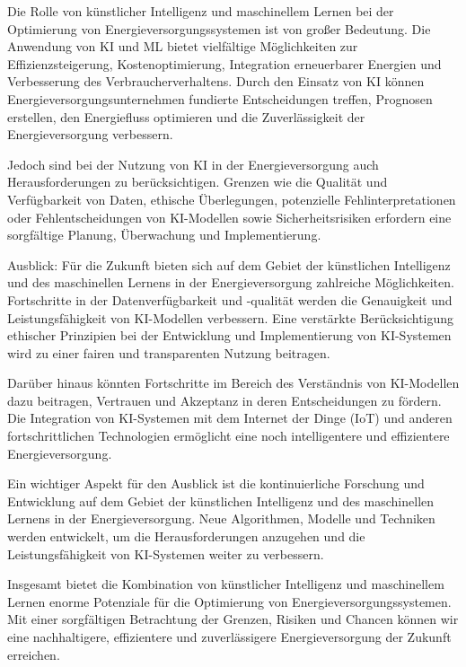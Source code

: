 Die Rolle von künstlicher Intelligenz und maschinellem Lernen bei der
Optimierung von Energieversorgungssystemen ist von großer Bedeutung. Die
Anwendung von KI und ML bietet vielfältige Möglichkeiten zur
Effizienzsteigerung, Kostenoptimierung, Integration erneuerbarer Energien und
Verbesserung des Verbraucherverhaltens. Durch den Einsatz von KI können
Energieversorgungsunternehmen fundierte Entscheidungen treffen, Prognosen
erstellen, den Energiefluss optimieren und die Zuverlässigkeit der
Energieversorgung verbessern.

Jedoch sind bei der Nutzung von KI in der Energieversorgung auch
Herausforderungen zu berücksichtigen. Grenzen wie die Qualität und
Verfügbarkeit von Daten, ethische Überlegungen, potenzielle
Fehlinterpretationen oder Fehlentscheidungen von KI-Modellen sowie
Sicherheitsrisiken erfordern eine sorgfältige Planung, Überwachung und
Implementierung.

Ausblick: Für die Zukunft bieten sich auf dem Gebiet der künstlichen
Intelligenz und des maschinellen Lernens in der Energieversorgung zahlreiche
Möglichkeiten. Fortschritte in der Datenverfügbarkeit und -qualität werden die
Genauigkeit und Leistungsfähigkeit von KI-Modellen verbessern. Eine verstärkte
Berücksichtigung ethischer Prinzipien bei der Entwicklung und Implementierung
von KI-Systemen wird zu einer fairen und transparenten Nutzung beitragen.

Darüber hinaus könnten Fortschritte im Bereich des Verständnis von
KI-Modellen dazu beitragen, Vertrauen und Akzeptanz in deren Entscheidungen zu
fördern. Die Integration von KI-Systemen mit dem Internet der Dinge (IoT) und
anderen fortschrittlichen Technologien ermöglicht eine noch intelligentere und
effizientere Energieversorgung.

Ein wichtiger Aspekt für den Ausblick ist die kontinuierliche Forschung und
Entwicklung auf dem Gebiet der künstlichen Intelligenz und des maschinellen
Lernens in der Energieversorgung. Neue Algorithmen, Modelle und Techniken
werden entwickelt, um die Herausforderungen anzugehen und die
Leistungsfähigkeit von KI-Systemen weiter zu verbessern.

Insgesamt bietet die Kombination von künstlicher Intelligenz und maschinellem
Lernen enorme Potenziale für die Optimierung von Energieversorgungssystemen.
Mit einer sorgfältigen Betrachtung der Grenzen, Risiken und Chancen können wir
eine nachhaltigere, effizientere und zuverlässigere Energieversorgung der
Zukunft erreichen.